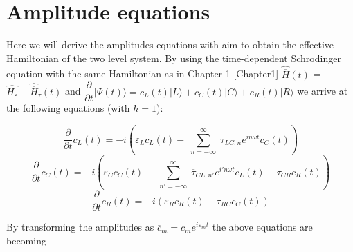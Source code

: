 
\chapter{Amplitude equations} %

\label{Chapter2} %





 

Here we will derive the amplitudes equations with aim to obtain the effective Hamiltonian of the two level system. By using the time-dependent Schrodinger equation with the same Hamiltonian as in Chapter 1 \ref{Chapter1} $\widehat{\overline{H}}(t)$ = $\widehat{H_{\varepsilon}} +\widehat{\overline{H}}_{\tau}(t)$ and $\dfrac{\partial}{\partial t} \vert \Psi (t) \rangle = c_L (t) \vert L \rangle + c_C (t) \vert C \rangle + c_R(t) \vert R \rangle$ we arrive at the following equations (with $\hbar=1$):

\begin{equation} \label{eq:2.1}
\dfrac{\partial}{\partial t} c_L (t) = -i \left( \varepsilon_L c_L(t) - \sum_{\substack{n=-\infty}}^{\infty} \overline{\tau}_{LC,n} e^{in\omega t } c_C (t) \right)
\end{equation}
\begin{equation} \label{eq:2.2}
\dfrac{\partial}{\partial t} c_C (t) = -i \left( \varepsilon_C c_C(t) - \sum_{\substack{n'=-\infty}}^{\infty} \overline{\tau}_{CL,n'} e^{i'n\omega t } c_L (t) -  {\tau}_{CR} c_R(t) \right)
\end{equation}
\begin{equation} \label{eq:2.3}
\dfrac{\partial}{\partial t} c_R (t) = -i \left( \varepsilon_R c_R(t) - {\tau}_{RC} c_C(t)  \right)
\end{equation}

By transforming the amplitudes as $\overline{c}_m = {c_m} e^{i \varepsilon_m t}$ the above equations are becoming 

